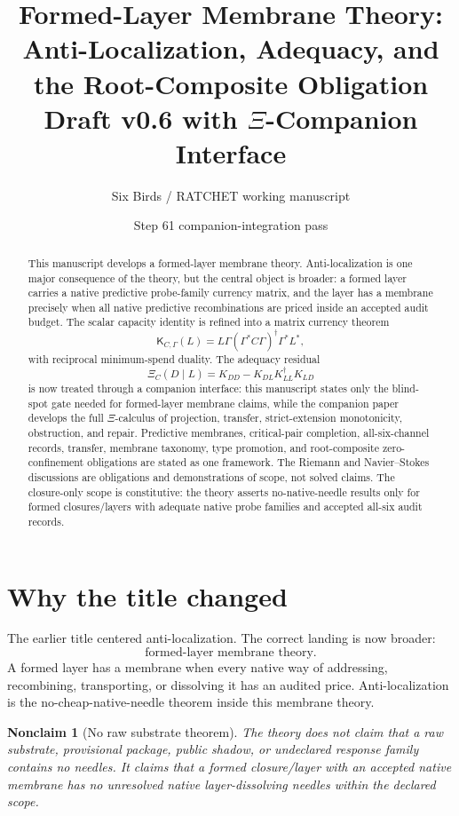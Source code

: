 \documentclass[11pt]{article}
\title{Formed-Layer Membrane Theory:\\
Anti-Localization, Adequacy, and the Root-Composite Obligation\\
\large Draft v0.6 with \(\Xi\)-Companion Interface}
\author{Six Birds / RATCHET working manuscript}
\date{Step 61 companion-integration pass}
\newtheorem{nonclaim}[theorem]{Nonclaim}
\newcommand{\K}{\mathsf K}
\begin{document}
\maketitle

\begin{abstract}
This manuscript develops a formed-layer membrane theory.  Anti-localization is one major consequence of the theory, but the central object is broader: a formed layer carries a native predictive probe-family currency matrix, and the layer has a membrane precisely when all native predictive recombinations are priced inside an accepted audit budget.  The scalar capacity identity is refined into a matrix currency theorem
\[
  \K_{C,\Gamma}(L)=L\Gamma(\Gamma^*C\Gamma)^\dagger\Gamma^*L^*,
\]
with reciprocal minimum-spend duality.  The adequacy residual
\[
  \Xi_C(D\mid L)=K_{DD}-K_{DL}K_{LL}^\dagger K_{LD}
\]
is now treated through a companion interface: this manuscript states only the blind-spot gate needed for formed-layer membrane claims, while the companion paper develops the full \(\Xi\)-calculus of projection, transfer, strict-extension monotonicity, obstruction, and repair.  Predictive membranes, critical-pair completion, all-six-channel records, transfer, membrane taxonomy, type promotion, and root-composite zero-confinement obligations are stated as one framework.  The Riemann and Navier--Stokes discussions are obligations and demonstrations of scope, not solved claims.  The closure-only scope is constitutive: the theory asserts no-native-needle results only for formed closures/layers with adequate native probe families and accepted all-six audit records.
\end{abstract}

\tableofcontents

\section{Why the title changed}

The earlier title centered anti-localization.  The correct landing is now broader:
\[
\boxed{\text{formed-layer membrane theory.}}
\]
A formed layer has a membrane when every native way of addressing, recombining, transporting, or dissolving it has an audited price.  Anti-localization is the no-cheap-native-needle theorem inside this membrane theory.

\begin{nonclaim}[No raw substrate theorem]
The theory does not claim that a raw substrate, provisional package, public shadow, or undeclared response family contains no needles.  It claims that a formed closure/layer with an accepted native membrane has no unresolved native layer-dissolving needles within the declared scope.
\end{nonclaim}
\end{document}
